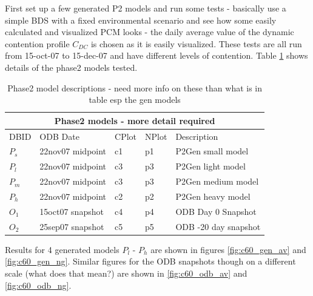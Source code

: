  First set up a few generated P2 models and run some tests - basically use a simple BDS with a fixed environmental scenario and see how some easily calculated and visualized PCM looks - the daily average value of the dynamic contention profile $C_{DC}$ is chosen as it is easily visualized. These tests are all run from 15-oct-07 to 15-dec-07 and have different levels of contention. Table \ref{tab:ltc_p2models} shows details of the phase2 models tested.

\begin{table}[h]
\label{tab:ltc_p2models}
 \begin{center}
  \begin{tabular}{lllll}
   \toprule
   \multicolumn{5}{c}{Phase2 models - more detail required} \\
   \midrule
   DBID & ODB Date & CPlot & NPlot & Description\\
   \midrule
   $P_s$ & 22nov07 midpoint & c1 & p1 & P2Gen small model \\ 
   $P_l$ & 22nov07 midpoint & c3 & p3 & P2Gen light model \\
   $P_m$ & 22nov07 midpoint & c3 & p3 & P2Gen medium model\\
   $P_h$ & 22nov07 midpoint & c2 & p2 & P2Gen heavy model \\
   \midrule
   $O_1$ & 15oct07 snapshot & c4 & p4 & ODB Day 0 Snapshot\\
   $O_2$ & 25sep07 snapshot & c5 & p5 & ODB -20 day snapshot\\
   \bottomrule
  \end{tabular}
 \end{center}
\caption{Phase2 model descriptions - need more info on these than what is in table esp the gen models}
\end{table}

Results for 4 generated models $P_l$ - $P_h$ are shown in figures \ref{fig:c60_gen_av} and \ref{fig:c60_gen_ng}. Similar figures for the ODB snapshots though on a different scale (what does that mean?) are shown in \ref{fig:c60_odb_av} and \ref{fig:c60_odb_ng}.

